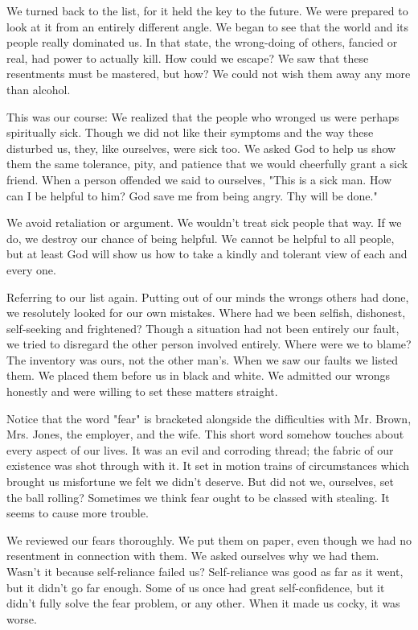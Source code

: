 \begin{biblechapter}
We turned back to the list, for it held the key to the future.  We were prepared to look at it from an entirely different angle.  We began to see that the world and its people really dominated us.  In that state, the wrong-doing of others, fancied or real, had power to actually kill.  How could we escape?  We saw that these resentments must be mastered, but how?  We could not wish them away any more than alcohol.

This was our course:  We realized that the people who wronged us were perhaps spiritually sick. Though we did not like their symptoms and the way these disturbed us, they, like ourselves, were sick too.  We asked God to help us show them the same tolerance, pity, and patience that we would cheerfully grant a sick friend.  When a person offended we said to ourselves, "This is a sick man.  How can I be helpful to him?  God save me from being angry.  Thy will be done."

We avoid retaliation or argument.  We wouldn't treat sick people that way.  If we do, we destroy our chance of being helpful.  We cannot be helpful to all people, but at least God will show us how to take a kindly and tolerant view of each and every one.

Referring to our list again.  Putting out of our minds the wrongs others had done, we resolutely looked for our own mistakes.  Where had we been selfish, dishonest, self-seeking and frightened?  Though a situation had not been entirely our fault, we tried to disregard the other person involved entirely.  Where were we to blame?  The inventory was ours, not the other man's.  When we saw our faults we listed them.  We placed them before us in black and white.  We admitted our wrongs honestly and were willing to set these matters straight.

Notice that the word "fear" is bracketed alongside the difficulties with Mr. Brown, Mrs. Jones, the employer, and the wife.  This short word somehow touches about every aspect of our lives.  It was an evil and corroding thread; the fabric of our existence was shot through with it.  It set in motion trains of circumstances which brought us misfortune we felt we didn't deserve.  But did not we, ourselves, set the ball rolling?  Sometimes we think fear ought to be classed with stealing.  It seems to cause more trouble.

We reviewed our fears thoroughly.  We put them on paper, even though we had no resentment in connection with them.  We asked ourselves why we had them.  Wasn't it because self-reliance failed us?  Self-reliance was good as far as it went, but it didn't go far enough.  Some of us once had great self-confidence, but it didn't fully solve the fear problem, or any other.  When it made us cocky, it was worse.


\end{biblechapter}
